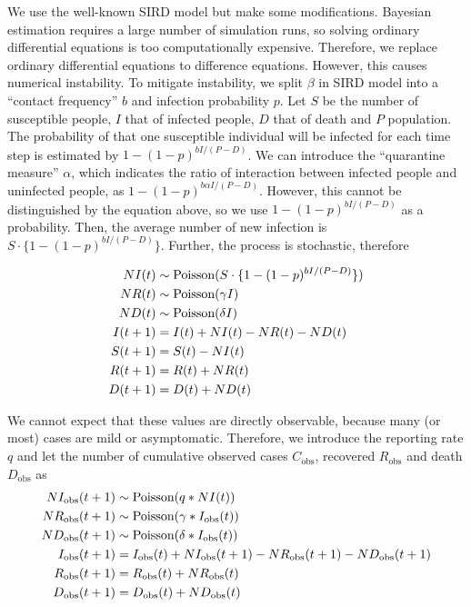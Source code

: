 \documentclass{amsart}
\begin{document}
We use the well-known SIRD model but make some modifications.
Bayesian estimation requires a large number of simulation runs, so solving ordinary differential equations is too computationally expensive.
Therefore, we replace ordinary differential equations to difference equations.
However, this causes numerical instability.
To mitigate instability, we split $\beta$ in SIRD model into a ``contact frequency'' $b$ and infection probability $p$.
Let $S$ be the number of susceptible people, $I$ that of infected people, $D$ that of death and $P$ population.
The probability of that one susceptible individual will be infected for each time step is estimated by $1 - (1 - p)^{b I / (P - D)}$.
We can introduce the ``quarantine measure'' $\alpha$, which indicates the ratio of interaction between infected people and uninfected people, as $1 - (1 - p)^{b \alpha I / (P - D)}$.
However, this cannot be distinguished by the equation above, so we use $1 - (1 - p)^{b I / (P - D)}$ as a probability.
Then, the average number of new infection is $S \cdot \{1 - (1 - p)^{b I / (P - D)} \}$.
Further, the process is stochastic, therefore 

\begin{align}
 NI(t) &\sim \textup{Poisson}(S \cdot \{1 - (1 - p)^{b I / (P - D)} \})\\
 NR(t) &\sim \textup{Poisson}(\gamma I)\\
 ND(t) &\sim \textup{Poisson}(\delta I)\\
 I(t+1) &= I(t) + NI(t) - NR(t) - ND(t)\\
 S(t+1) &= S(t) - NI(t)\\
 R(t+1) &= R(t) + NR(t)\\
 D(t+1) &= D(t) + ND(t)
\end{align}

We cannot expect that these values are directly observable, because many (or most) cases are mild or asymptomatic.
Therefore, we introduce the reporting rate $q$ and let the number of cumulative observed cases $C_{\text{obs}}$, recovered $R_{\text{obs}}$ and death $D_{\text{obs}}$ as
\begin{align}
 NI_{\text{obs}}(t+1) &\sim \textup{Poisson}(q * NI(t))\\
 NR_{\text{obs}}(t+1) &\sim \textup{Poisson}(\gamma * I_{\text{obs}}(t))\\
 ND_{\text{obs}}(t+1) &\sim \textup{Poisson}(\delta * I_{\text{obs}}(t))\\
 I_{\text{obs}}(t+1) &= I_{\text{obs}}(t) + NI_{\text{obs}}(t+1) - NR_{\text{obs}}(t+1) - ND_{\text{obs}}(t+1)\\
 R_{\text{obs}}(t+1) &= R_{\text{obs}}(t) + NR_{\text{obs}}(t)\\
 D_{\text{obs}}(t+1) &= D_{\text{obs}}(t) + ND_{\text{obs}}(t)
\end{align}
\end{document}
